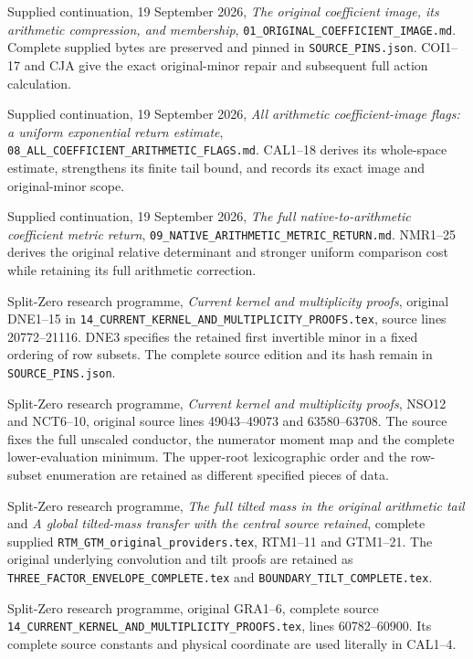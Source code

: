Supplied continuation, 19 September 2026,
\emph{The original coefficient image, its arithmetic compression,
and membership}, \texttt{01\_ORIGINAL\_COEFFICIENT\_IMAGE.md}.
Complete supplied bytes are preserved and pinned in
\texttt{SOURCE\_PINS.json}. COI1--17 and CJA give the exact
original-minor repair and subsequent full action calculation.

Supplied continuation, 19 September 2026,
\emph{All arithmetic coefficient-image flags: a uniform exponential
return estimate}, \texttt{08\_ALL\_COEFFICIENT\_ARITHMETIC\_FLAGS.md}.
CAL1--18 derives its whole-space estimate, strengthens its finite
tail bound, and records its exact image and original-minor scope.

Supplied continuation, 19 September 2026,
\emph{The full native-to-arithmetic coefficient metric return},
\texttt{09\_NATIVE\_ARITHMETIC\_METRIC\_RETURN.md}.
NMR1--25 derives the original relative determinant and stronger
uniform comparison cost while retaining its full arithmetic correction.

Split-Zero research programme, \emph{Current kernel and multiplicity
proofs}, original DNE1--15 in
\texttt{14\_CURRENT\_KERNEL\_AND\_MULTIPLICITY\_PROOFS.tex},
source lines 20772--21116. DNE3 specifies the retained first
invertible minor in a fixed ordering of row subsets. The complete
source edition and its hash remain in \texttt{SOURCE\_PINS.json}.

Split-Zero research programme, \emph{Current kernel and multiplicity
proofs}, NSO12 and NCT6--10, original source lines 49043--49073
and 63580--63708. The source fixes the full unscaled conductor,
the numerator moment map and the complete lower-evaluation minimum.
The upper-root lexicographic order and the row-subset enumeration
are retained as different specified pieces of data.

Split-Zero research programme, \emph{The full tilted mass in the
original arithmetic tail} and \emph{A global tilted-mass transfer
with the central source retained}, complete supplied
\texttt{RTM\_GTM\_original\_providers.tex}, RTM1--11 and GTM1--21.
The original underlying convolution and tilt proofs are retained
as \texttt{THREE\_FACTOR\_ENVELOPE\_COMPLETE.tex} and
\texttt{BOUNDARY\_TILT\_COMPLETE.tex}.

Split-Zero research programme, original GRA1--6, complete source
\texttt{14\_CURRENT\_KERNEL\_AND\_MULTIPLICITY\_PROOFS.tex},
lines 60782--60900. Its complete source constants and physical
coordinate are used literally in CAL1--4.

